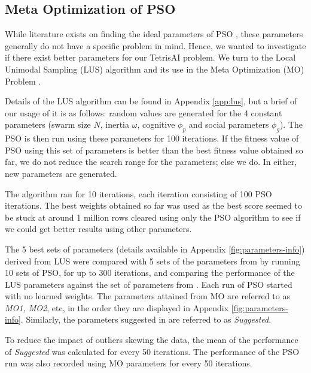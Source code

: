 \documentclass[12pt]{article}
\numberwithin{table}{section}
\numberwithin{figure}{section}
\begin{document}
\subsection{Meta Optimization of PSO}\label{sec:meta-opt}
While literature exists on finding the ideal parameters of PSO \cite{Shi1998ParameterOptimization}, these parameters generally do not have a specific problem in mind. Hence, we wanted to investigate if there exist better parameters for our TetrisAI problem. We turn to the Local Unimodal Sampling (LUS) algorithm \cite{ErikLocalSampling} and its use in the Meta Optimization (MO) Problem \cite{Pedersen2010SimplifyingOptimization}. 

Details of the LUS algorithm can be found in Appendix \ref{app:lus}, but a brief of our usage of it is as follows: random values are generated for the 4 constant parameters (swarm size $N$, inertia $\omega$, cognitive $\phi_p$ and social parameters $\phi_g$). The PSO is then run using these parameters for 100 iterations. If the fitness value of PSO using this set of parameters is better than the best fitness value obtained so far, we do not reduce the search range for the parameters; else we do. In either, new parameters are generated.

The algorithm ran for 10 iterations, each iteration consisting of 100 PSO iterations. The best weights obtained so far was used as the best score seemed to be stuck at around 1 million rows cleared using only the PSO algorithm to see if we could get better results using other parameters.

The 5 best sets of parameters (details available in Appendix \ref{fig:parameters-info}) derived from LUS were compared with 5 sets of the parameters from \cite{VanDenBergh2006ATrajectories} by running 10 sets of PSO, for up to 300 iterations, and comparing the performance of the LUS parameters against the set of parameters from \cite{VanDenBergh2006ATrajectories}. Each run of PSO started with no learned weights. The parameters attained from MO are referred to as \emph{MO1, MO2}, etc, in the order they are displayed in Appendix \ref{fig:parameters-info}. Similarly, the parameters suggested in \cite{VanDenBergh2006ATrajectories} are referred to as \emph{Suggested}.

To reduce the impact of outliers skewing the data, the mean of  the performance of \emph{Suggested} was calculated  for every 50 iterations. The performance of the PSO run was also recorded using MO parameters for every 50 iterations.
\end{document}
